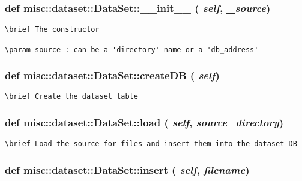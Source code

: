 \subsubsection{\setlength{\rightskip}{0pt plus 5cm}def misc::dataset::Data\-Set::\_\-\_\-init\_\-\_\- ( {\em self},  {\em \_\-source})}\label{classmisc_1_1dataset_1_1DataSet_50f607e435b63ef35bf75be4029d647c}




\footnotesize\begin{verbatim}
\brief The constructor

\param source : can be a 'directory' name or a 'db_address'
\end{verbatim}
\normalsize
\subsubsection{\setlength{\rightskip}{0pt plus 5cm}def misc::dataset::Data\-Set::create\-DB ( {\em self})}\label{classmisc_1_1dataset_1_1DataSet_4b20df2d3f36093a1d6f4847ab3bcc46}




\footnotesize\begin{verbatim}
\brief Create the dataset table

\end{verbatim}
\normalsize
\subsubsection{\setlength{\rightskip}{0pt plus 5cm}def misc::dataset::Data\-Set::load ( {\em self},  {\em source\_\-directory})}\label{classmisc_1_1dataset_1_1DataSet_1e99d2255e33faab812b07594ec87fa6}




\footnotesize\begin{verbatim}
\brief Load the source for files and insert them into the dataset DB

\end{verbatim}
\normalsize
\subsubsection{\setlength{\rightskip}{0pt plus 5cm}def misc::dataset::Data\-Set::insert ( {\em self},  {\em filename})}\label{classmisc_1_1dataset_1_1DataSet_aa7445373b3c8d695b8610541f64d2db}




